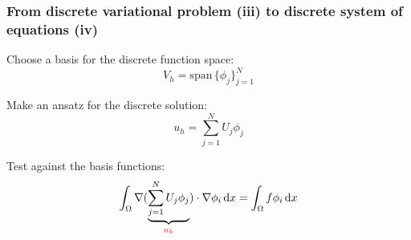 \begin{frame}
  \frametitle{From discrete variational problem (iii) to discrete
    system of equations (iv)}

  Choose a basis for the discrete function space:
  \begin{equation*}
    V_h = \mathrm{span} \, \{\phi_j\}_{j=1}^N
  \end{equation*}

  Make an ansatz for the discrete solution:
  \begin{equation*}
    u_h = \sum_{j=1}^N U_j \phi_j
  \end{equation*}

  Test against the basis functions:
  \begin{equation*}
    \int_{\Omega} \nabla
    (\underbrace{\sum_{j=1}^N U_j \phi_j}_{\textcolor{red}{u_h}})
    \cdot \nabla \phi_i \, \mathrm{d}x = \int_{\Omega} f \phi_i \, \mathrm{d}x
  \end{equation*}

\end{frame}
